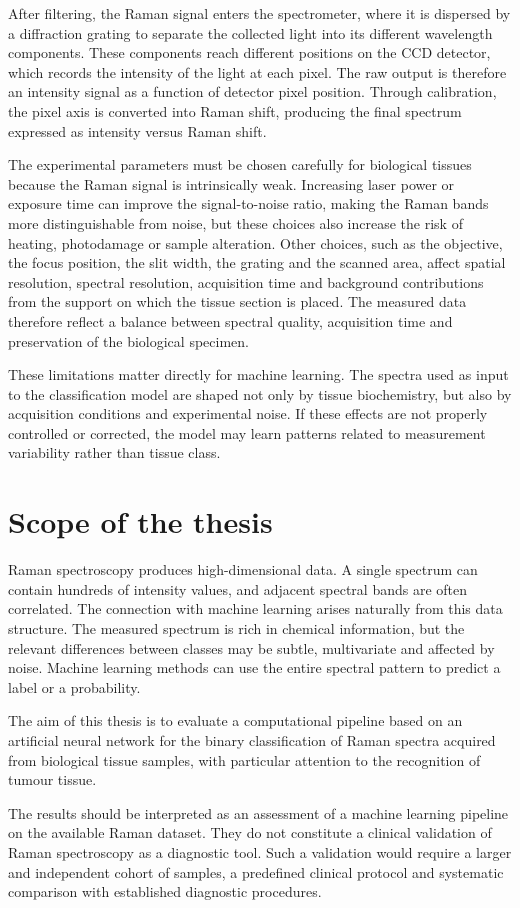 After filtering, the Raman signal enters the spectrometer, where it is dispersed by a diffraction grating to separate the collected light into its different wavelength components. These components reach different positions on the CCD detector, which records the intensity of the light at each pixel. The raw output is therefore an intensity signal as a function of detector pixel position. Through calibration, the pixel axis is converted into Raman shift, producing the final spectrum expressed as intensity versus Raman shift.

The experimental parameters must be chosen carefully for biological tissues because the Raman signal is intrinsically weak. Increasing laser power or exposure time can improve the signal-to-noise ratio, making the Raman bands more distinguishable from noise, but these choices also increase the risk of heating, photodamage or sample alteration. Other choices, such as the objective, the focus position, the slit width, the grating and the scanned area, affect spatial resolution, spectral resolution, acquisition time and background contributions from the support on which the tissue section is placed. The measured data therefore reflect a balance between spectral quality, acquisition time and preservation of the biological specimen.

These limitations matter directly for machine learning. The spectra used as input to the classification model are shaped not only by tissue biochemistry, but also by acquisition conditions and experimental noise. If these effects are not properly controlled or corrected, the model may learn patterns related to measurement variability rather than tissue class.

\section{Scope of the thesis}
\label{sec:scope_thesis}

Raman spectroscopy produces high-dimensional data. A single spectrum can contain hundreds of intensity values, and adjacent spectral bands are often correlated. The connection with machine learning arises naturally from this data structure. The measured spectrum is rich in chemical information, but the relevant differences between classes may be subtle, multivariate and affected by noise. Machine learning methods can use the entire spectral pattern to predict a label or a probability.

The aim of this thesis is to evaluate a computational pipeline based on an artificial neural network for the binary classification of Raman spectra acquired from biological tissue samples, with particular attention to the recognition of tumour tissue.

The results should be interpreted as an assessment of a machine learning pipeline on the available Raman dataset. They do not constitute a clinical validation of Raman spectroscopy as a diagnostic tool. Such a validation would require a larger and independent cohort of samples, a predefined clinical protocol and systematic comparison with established diagnostic procedures.
